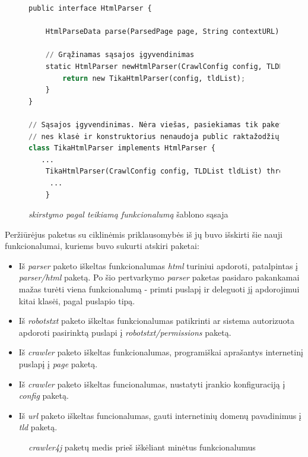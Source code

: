 \begin{figure}[H]
    \begin{lstlisting}[language=Python]
public interface HtmlParser {

    HtmlParseData parse(ParsedPage page, String contextURL) throws ParseException;

    // Grąžinamas sąsajos įgyvendinimas
    static HtmlParser newHtmlParser(CrawlConfig config, TLDList tldList) throws InstantiationException, IllegalAccessException  {
        return new TikaHtmlParser(config, tldList);
    }
}

// Sąsajos įgyvendinimas. Nėra viešas, pasiekiamas tik paketo viduje,
// nes klasė ir konstruktorius nenaudoja public raktažodžių
class TikaHtmlParser implements HtmlParser {
   ...
    TikaHtmlParser(CrawlConfig config, TLDList tldList) throws InstantiationException, IllegalAccessException {
     ...
    }
    \end{lstlisting}
    \caption{\textit{skirstymo pagal teikiamą funkcionalumą} šablono sąsaja}
\end{figure}
Peržiūrėjus paketus su ciklinėmis priklausomybės iš jų buvo išskirti šie nauji funkcionalumai, kuriems
buvo sukurti atskiri paketai:
\begin{itemize}
    \item Iš \textit{parser} paketo iškeltas funkcionalumas \textit{html} turiniui apdoroti, patalpintas į \textit{parser/html} paketą.
    Po šio pertvarkymo \textit{parser} paketas pasidaro pakankamai mažas turėti viena funkcionalumą - primti puslapį ir deleguoti jį apdorojimui kitai klasėi, pagal puslapio tipą.
    \item Iš \textit{robotstxt} paketo iškeltas funkcionalumas patikrinti ar sistema autorizuota apdoroti pasirinktą puslapi į \textit{robotstxt/permissions} paketą.
    \item Iš \textit{crawler} paketo iškeltas funkcionalumas, programiškai aprašantys internetinį puslapį į \textit{page} paketą.
    \item Iš \textit{crawler} paketo iškeltas funcionalumas, nustatyti įrankio konfiguraciją į \textit{config} paketą.
    \item Iš \textit{url} paketo iškeltas funcionalumas, gauti internetinių domenų pavadinimus į  \textit{tld} paketą.
\end{itemize}

\begin{figure}[H]
    \snugshade
    \endsnugshade
    \caption{\textit{crawler4j} paketų medis prieš iškėliant minėtus funkcionalumus}
\end{figure}

